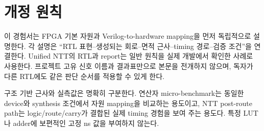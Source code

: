 \section{개정 원칙}

이 경험서는 FPGA 기본 자원과 Verilog-to-hardware mapping을 먼저 독립적으로
설명한다. 각 설명은 ``RTL 표현--생성되는 회로--면적 근사--timing 경로--검증
조건''을 연결한다. Unified NTT의 RTL과 report는 일반 원칙을 실제 개발에서
확인한 사례로 사용한다. 프로젝트 고유 신호 이름과 결과표만으로 본문을 전개하지
않으며, 독자가 다른 RTL에도 같은 판단 순서를 적용할 수 있게 한다.

구조 기반 근사와 실측값은 명확히 구분한다. 연산자 micro-benchmark는 동일한
device와 synthesis 조건에서 자원 mapping을 비교하는 용도이고, NTT post-route
path는 logic/route/carry가 결합된 실제 timing 경험을 보여 주는 용도다. 특정
LUT나 adder에 보편적인 고정 ns 값을 부여하지 않는다.
